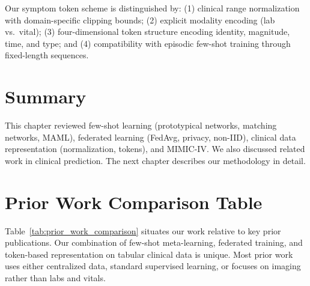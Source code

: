Our symptom token scheme is distinguished by: (1) clinical range normalization with domain-specific clipping bounds; (2) explicit modality encoding (lab vs.\ vital); (3) four-dimensional token structure encoding identity, magnitude, time, and type; and (4) compatibility with episodic few-shot training through fixed-length sequences.

\section{Summary}

This chapter reviewed few-shot learning (prototypical networks, matching networks, MAML), federated learning (FedAvg, privacy, non-IID), clinical data representation (normalization, tokens), and MIMIC-IV. We also discussed related work in clinical prediction. The next chapter describes our methodology in detail.

\section{Prior Work Comparison Table}

Table~\ref{tab:prior_work_comparison} situates our work relative to key prior publications. Our combination of few-shot meta-learning, federated training, and token-based representation on tabular clinical data is unique. Most prior work uses either centralized data, standard supervised learning, or focuses on imaging rather than labs and vitals.

